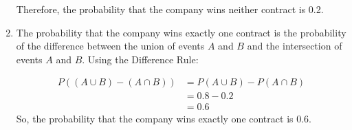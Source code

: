 \begin{solution}
\begin{enumerate}[label=(\alph*)]
        Therefore, the probability that the company wins neither contract is 0.2.
        
        \item The probability that the company wins exactly one contract is the probability of the difference between the union of events $A$ and $B$ and the intersection of events $A$ and $B$. Using the Difference Rule:
            
            \begin{align*}
                P((A \cup B) - (A \cap B)) &= P(A \cup B) - P(A \cap B) \\
                                            &= 0.8 - 0.2 \\
                                            &= 0.6
            \end{align*}
            So, the probability that the company wins exactly one contract is 0.6.
            \end{enumerate}
\end{solution}

